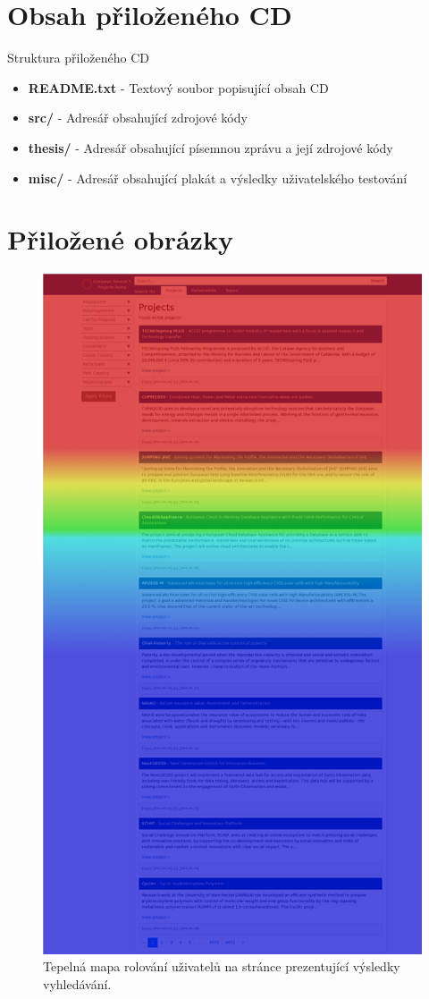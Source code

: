 \chapter{Obsah přiloženého CD}
Struktura přiloženého CD
\begin{itemize}
\item \textbf{README.txt} - Textový soubor popisující obsah CD
\item \textbf{src/} - Adresář obsahující zdrojové kódy
\item \textbf{thesis/} - Adresář obsahující písemnou zprávu a její zdrojové kódy
\item \textbf{misc/} - Adresář obsahující plakát a výsledky uživatelského testování
\end{itemize}

\chapter{Přiložené obrázky}
\begin{figure}[H]
	\centering
	\includegraphics[height=\textheight-8cm]{obrazky-figures/heatmap-scroll.png}
	\caption{Tepelná mapa rolování uživatelů na stránce prezentující výsledky vyhledávání.}
    \label{img:heatmap-scroll}
\end{figure}